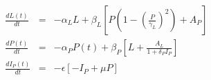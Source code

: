 \begin{eqnarray}
  \frac{dL(t)}{dt} &=& -\alpha_{L}L + \beta_{L}\left[P\left(1-\left(\frac{P}{\gamma_{L}}\right)^{2}\right) + A_{P}\right] \\
  \frac{dP(t)}{dt} &=& -\alpha_{P}P(t) + \beta_{P}\left[L + \frac{A_{L}}{1+\delta_{P}I_{P}}\right] \\
  \frac{dI_{P}(t)}{dt} &=& -\epsilon [-I_{P} + \mu P]
\end{eqnarray}

 
